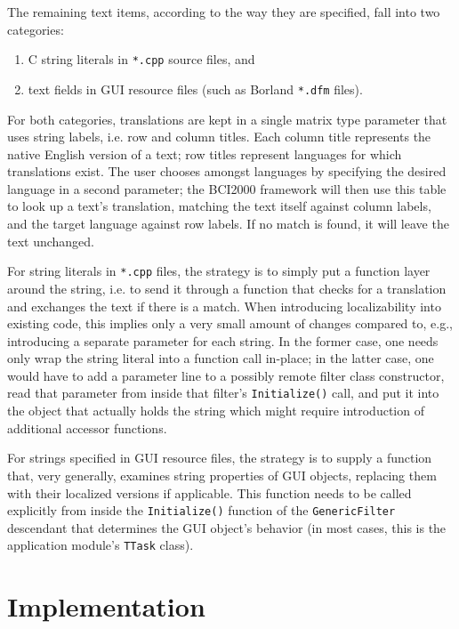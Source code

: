 \documentclass[12pt,letterpaper]{article}
\begin{document}
The remaining text items, according to the way they are specified, fall into two categories:
\begin{enumerate}
\item
C string literals in \texttt{*.cpp} source files, and
\item
text fields in GUI resource files (such as Borland \texttt{*.dfm} files).
\end{enumerate}

For both categories, translations are kept in a single matrix type parameter that uses string labels,
i.e. row and column titles.
Each column title represents the native English version of a text; row titles represent
languages for which translations exist. The user chooses amongst languages by specifying
the desired language in a second parameter; the BCI2000 framework will then use this table to look up a text's translation, matching the text itself against column labels, and 
the target language against row labels. If no match is found, it will leave the text unchanged.

For string literals in \texttt{*.cpp} files, the strategy is to simply put a function layer around the string, i.e. to send it through a function that checks for a translation
and exchanges the text if there is a match. When introducing localizability into existing code, this implies only a very small amount of changes compared to, e.g., introducing
a separate parameter for each string. In the former case, one needs only wrap the string literal into a function call in-place; in the latter case, one would have to add a parameter line to a possibly remote filter class constructor, read that parameter from inside that filter's \texttt{Initialize()} call, and put it into the object that actually holds the string which might require introduction of additional accessor functions.

For strings specified in GUI resource files, the strategy is to supply a function that, very generally, examines string properties of GUI objects, replacing them with their localized versions if applicable.
This function needs to be called explicitly from inside the \texttt{Initialize()} function of the \texttt{GenericFilter} descendant that determines the GUI object's behavior (in most cases, this is the application module's \texttt{TTask} class).

\section{Implementation}
\end{document}
